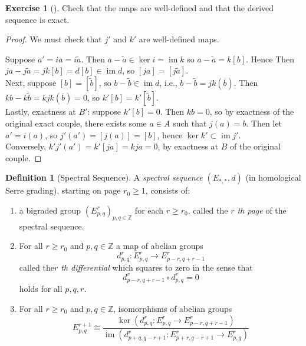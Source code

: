 \documentclass[reqno]{amsart}
\theoremstyle{definition}
\newtheorem{definition}[theorem]{Definition}
\newtheorem{exercise}[theorem]{Exercise}
\theoremstyle{remark}
\DeclareMathOperator{\im}{im}
\begin{document}
\begin{exercise}[]
    Check that the maps are well-defined and that the
    derived sequence is exact.
\end{exercise}

\begin{proof}
    We must check that $j'$ and $k'$ are well-defined maps.

    Suppose $a' = ia = i \tilde{a}$.
    Then $a-\tilde{a} \in \ker i = \im k$ so
    $a - \tilde{a} = k\left[ b \right] $. Hence
    Then
    $j a - j \tilde{a} =
    j k \left[ b \right] 
    = d \left[ b \right] \in \im d$, so
    $\left[ j a \right] =
    \left[ j \tilde{a} \right] $.\\
    Next, suppose
    $\left[ b \right] = \left[ \tilde{b} \right] $, so
    $b - \tilde{b}\in 
    \im d$, i.e., $b - \tilde{b} = 
    jk (\overline{b})$.
    Then
    $k b - k \tilde{b} = 
    kjk (\overline{b}) = 
    0$, so
    $k' \left[ b \right] =
    k'\left[ \tilde{b} \right] $.\\
    \linebreak
    Lastly, exactness at $B'$:
     suppose $k' \left[ b \right] = 0$. Then
     $kb = 0$, so by exactness of the original exact
     couple, there exists some $a \in A$ such that
     $j (a) = b$. Then
     let $a' = i(a)$, so
     $j' (a') = \left[ j (a) \right] =
     \left[ b \right] $, hence
     $\ker k' \subset \im j'$.\\
     Conversely, 
     $k' j' (a') =
     k' \left[ ja \right] =
     kja = 0$, by exactness at
     $B$ of the original couple.
\end{proof}

\begin{definition}[Spectral Sequence]
    A \textit{spectral sequence} $\left( E_{*,*},d \right) $ 
    (in homological Serre grading), starting on page
    $r_0 \ge 1$, consists of:
    \begin{enumerate}
        \item a bigraded group
            $\left( E_{p,q}^{r} \right)_{p,q \in \mathbb{Z}}$ 
            for each $r \ge r_0$, called the
            \textit{$r$ th page} of the spectral sequence.
        \item For all $r \ge r_0$ and $p, q \in \mathbb{Z}$ 
            a map of abelian groups
            \[
            d_{p,q}^{r} \colon E_{p,q}^{r} \to 
            E_{p-r,q+r-1}^{r}
            \] 
            called the\textit{$r$ th differential}
            which squares to zero in the
            sense that
             \[
             d_{p-r,q+r-1}^{r} \circ
             d_{p,q}^{r} = 0
             \] 
             holds for all $p,q,r$.
         \item For all $r \ge r_0$ and
             $p,q \in \mathbb{Z}$, isomorphisms of abelian groups
             \[
             E_{p,q}^{r+1} \cong
             \frac{\ker \left( d_{p,q}^{r} \colon
             E_{p,q}^{r} \to E_{p-r,q+r-1}^{r}\right) }{
         \im \left( d_{p+q,q-r+1}^{r} \colon
     E_{p+r,q-r+1}^{r} \to E_{p,q}^{r}\right) }
             \] 
    \end{enumerate}
\end{definition}
\end{document}
